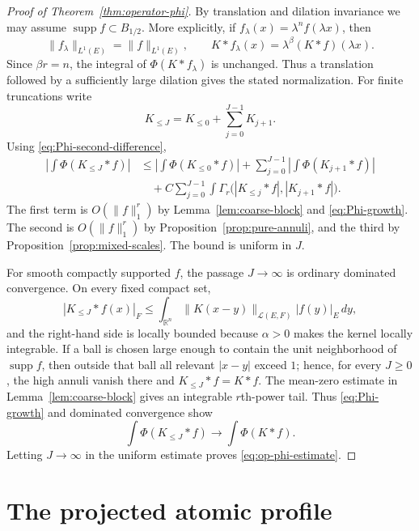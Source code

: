 \documentclass[11pt]{amsart}
\numberwithin{equation}{section}
\theoremstyle{definition}
\theoremstyle{remark}
\newcommand{\R}{\mathbb R}
\newcommand{\cL}{\mathcal L}
\newcommand{\supp}{\operatorname{supp}}
\newcommand{\norm}[1]{\lVert #1\rVert}
\begin{document}
\begin{proof}[Proof of Theorem~\ref{thm:operator-phi}]
By translation and dilation invariance we may assume
$\supp f\subset B_{1/2}$.  More explicitly, if
$f_\lambda(x)=\lambda^n f(\lambda x)$, then
\[
 \norm{f_\lambda}_{L^1(E)}=\norm f_{L^1(E)},\qquad
 K*f_\lambda(x)=\lambda^\beta(K*f)(\lambda x).
\]
Since $\beta r=n$, the integral of $\Phi(K*f_\lambda)$ is unchanged.  Thus a
translation followed by a sufficiently large dilation gives the stated
normalization.  For finite truncations write
\[
 K_{\le J}=K_{\le0}+\sum_{j=0}^{J-1}K_{j+1}.
\]
Using \eqref{eq:Phi-second-difference},
\begin{align*}
 \left|\int\Phi(K_{\le J}*f)\right|
 &\le \left|\int\Phi(K_{\le0}*f)\right|
   +\sum_{j=0}^{J-1}\left|\int\Phi(K_{j+1}*f)\right|\\
 &\quad
   +C\sum_{j=0}^{J-1}\int
   \Gamma_r\bigl(|K_{\le j}*f|,|K_{j+1}*f|\bigr).
\end{align*}
The first term is $O(\norm f_1^r)$ by
Lemma~\ref{lem:coarse-block} and \eqref{eq:Phi-growth}.  The second is
$O(\norm f_1^r)$ by Proposition~\ref{prop:pure-annuli}, and the third by
Proposition~\ref{prop:mixed-scales}.  The bound is uniform in $J$.

For smooth compactly supported $f$, the passage $J\to\infty$ is ordinary
dominated convergence.  On every fixed compact set,
\[
 |K_{\le J}*f(x)|_F
 \le \int_{\R^n}\norm{K(x-y)}_{\cL(E,F)}|f(y)|_E\,dy,
\]
and the right-hand side is locally bounded because $\alpha>0$ makes the
kernel locally integrable.  If a ball is chosen large enough to contain the
unit neighborhood of $\supp f$, then outside that ball all relevant
$|x-y|$ exceed $1$; hence, for every $J\ge0$, the high annuli vanish there and
$K_{\le J}*f=K*f$.  The mean-zero estimate in
Lemma~\ref{lem:coarse-block} gives an integrable $r$th-power tail.  Thus
\eqref{eq:Phi-growth} and dominated convergence show
\[
 \int\Phi(K_{\le J}*f)\longrightarrow\int\Phi(K*f).
\]
Letting $J\to\infty$ in the uniform estimate proves
\eqref{eq:op-phi-estimate}.
\end{proof}



\section{The projected atomic profile}\label{sec:profile}
\end{document}
